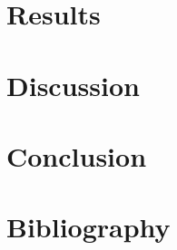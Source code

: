 \documentclass[
  11pt,
]{article}
\begin{document}
\hypertarget{results}{%
\section{Results}\label{results}}

\lipsum[4-7]

\hypertarget{discussion}{%
\section{Discussion}\label{discussion}}

\lipsum[4-7]

\hypertarget{conclusion}{%
\section{Conclusion}\label{conclusion}}

\lipsum[4-7]

\clearpage
\newpage
\onehalfspace
{}

\pagestyle{end}

\hypertarget{bibliography}{%
\section*{Bibliography}\label{bibliography}}
\end{document}
